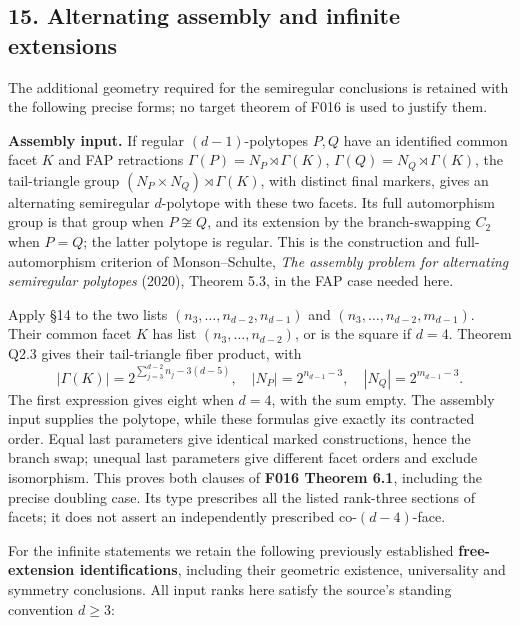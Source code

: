 \documentclass[
  10pt,
  letterpaper,
]{article}
\begin{document}
\subsection{15. Alternating assembly and infinite
extensions}\label{alternating-assembly-and-infinite-extensions}

The additional geometry required for the semiregular conclusions is
retained with the following precise forms; no target theorem of F016 is
used to justify them.

\textbf{Assembly input.} If regular \((d-1)\)-polytopes \(P,Q\) have an
identified common facet \(K\) and FAP retractions
\(\Gamma(P)=N_P\rtimes\Gamma(K)\), \(\Gamma(Q)=N_Q\rtimes\Gamma(K)\),
the tail-triangle group \((N_P\times N_Q)\rtimes\Gamma(K)\), with
distinct final markers, gives an alternating semiregular \(d\)-polytope
with these two facets. Its full automorphism group is that group when
\(P\not\cong Q\), and its extension by the branch-swapping \(C_2\) when
\(P=Q\); the latter polytope is regular. This is the construction and
full-automorphism criterion of Monson--Schulte, \emph{The assembly
problem for alternating semiregular polytopes} (2020), Theorem 5.3, in
the FAP case needed here.

Apply §14 to the two lists \((n_3,\ldots,n_{d-2},n_{d-1})\) and
\((n_3,\ldots,n_{d-2},m_{d-1})\). Their common facet \(K\) has list
\((n_3,\ldots,n_{d-2})\), or is the square if \(d=4\). Theorem Q2.3
gives their tail-triangle fiber product, with \[
 |\Gamma(K)|=2^{\sum_{j=3}^{d-2}n_j-3(d-5)},\quad
 |N_P|=2^{n_{d-1}-3},\quad |N_Q|=2^{m_{d-1}-3}.
\] The first expression gives eight when \(d=4\), with the sum empty.
The assembly input supplies the polytope, while these formulas give
exactly its contracted order. Equal last parameters give identical
marked constructions, hence the branch swap; unequal last parameters
give different facet orders and exclude isomorphism. This proves both
clauses of \textbf{F016 Theorem 6.1}, including the precise doubling
case. Its type prescribes all the listed rank-three sections of facets;
it does not assert an independently prescribed co-\((d-4)\)-face.

For the infinite statements we retain the following previously
established \textbf{free-extension identifications}, including their
geometric existence, universality and symmetry conclusions. All input
ranks here satisfy the source's standing convention \(d\ge3\):
\end{document}
